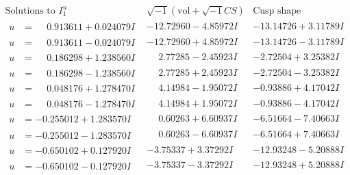 \documentclass[1p]{elsarticle_modified}
\theoremstyle{definition}
\newcommand{\I}{\sqrt{-1}}
\begin{document}
$$\begin{array}{c|c|c}  
\text{Solutions to }I^u_{1}& \I (\text{vol} + \sqrt{-1}CS) & \text{Cusp shape}\\
 \hline 
\begin{aligned}
u &= \phantom{-}0.913611 + 0.024079 I\end{aligned}
 & -12.72960 - 4.85972 I & -13.14726 + 3.11789 I \\ \hline\begin{aligned}
u &= \phantom{-}0.913611 - 0.024079 I\end{aligned}
 & -12.72960 + 4.85972 I & -13.14726 - 3.11789 I \\ \hline\begin{aligned}
u &= \phantom{-}0.186298 + 1.238560 I\end{aligned}
 & \phantom{-}2.77285 - 2.45923 I & -2.72504 + 3.25382 I \\ \hline\begin{aligned}
u &= \phantom{-}0.186298 - 1.238560 I\end{aligned}
 & \phantom{-}2.77285 + 2.45923 I & -2.72504 - 3.25382 I \\ \hline\begin{aligned}
u &= \phantom{-}0.048176 + 1.278470 I\end{aligned}
 & \phantom{-}4.14984 - 1.95072 I & -0.93886 + 4.17042 I \\ \hline\begin{aligned}
u &= \phantom{-}0.048176 - 1.278470 I\end{aligned}
 & \phantom{-}4.14984 + 1.95072 I & -0.93886 - 4.17042 I \\ \hline\begin{aligned}
u &= -0.255012 + 1.283570 I\end{aligned}
 & \phantom{-}0.60263 + 6.60937 I & -6.51664 - 7.40663 I \\ \hline\begin{aligned}
u &= -0.255012 - 1.283570 I\end{aligned}
 & \phantom{-}0.60263 - 6.60937 I & -6.51664 + 7.40663 I \\ \hline\begin{aligned}
u &= -0.650102 + 0.127920 I\end{aligned}
 & -3.75337 + 3.37292 I & -12.93248 - 5.20888 I \\ \hline\begin{aligned}
u &= -0.650102 - 0.127920 I\end{aligned}
 & -3.75337 - 3.37292 I & -12.93248 + 5.20888 I \\ \hline\begin{aligned}

\end{aligned}
\end{array}$$
\end{document}

